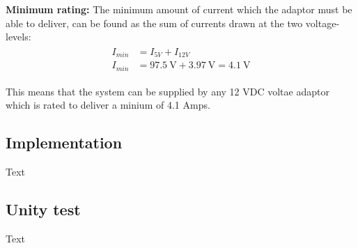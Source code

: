 \textbf{Minimum rating:} The minimum amount of current which the adaptor must be able to deliver, can be found as the sum of currents drawn at the two voltage-levels:
\begin{align}
	\begin{split}
		I_{min} &= I_{5V} + I_{12V}\\
		I_{min} &= \SI{97.5}{\volt} + \SI{3.97}{\volt} = \SI{4.1}{\volt}
	\end{split}
\end{align}

This means that the system can be supplied by any 12 VDC voltae adaptor which is rated to deliver a minium of 4.1 Amps.

\subsection{Implementation}
Text

\subsection{Unity test}
Text